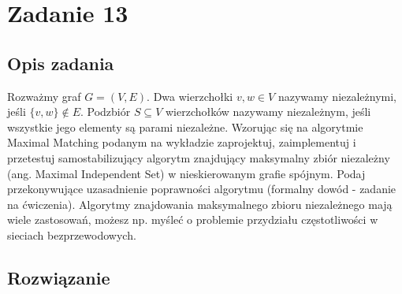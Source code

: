 \documentclass{article}
\begin{document}
    \begin{table}[H]
        \begin{center}
        \end{center}
    \end{table}


    \section{Zadanie 13}
	\subsection{Opis zadania}
    Rozważmy graf $G= (V,E)$. Dwa wierzchołki $v,w \in V$ nazywamy niezależnymi, jeśli $\{v,w\} \notin E$. Podzbiór $S \subseteq V$ wierzchołków 
    nazywamy niezależnym, jeśli wszystkie jego elementy są parami niezależne. Wzorując się na algorytmie Maximal Matching podanym na wykładzie 
    zaprojektuj, zaimplementuj i przetestuj samostabilizujący algorytm znajdujący maksymalny zbiór niezależny (ang. Maximal Independent Set) 
    w nieskierowanym grafie spójnym. Podaj przekonywujące uzasadnienie poprawności algorytmu (formalny dowód - zadanie na ćwiczenia). 
    Algorytmy znajdowania maksymalnego zbioru niezależnego mają wiele zastosowań, możesz np. myśleć o problemie przydziału częstotliwości 
    w sieciach bezprzewodowych.
    
    \subsection{Rozwiązanie}
\end{document}
